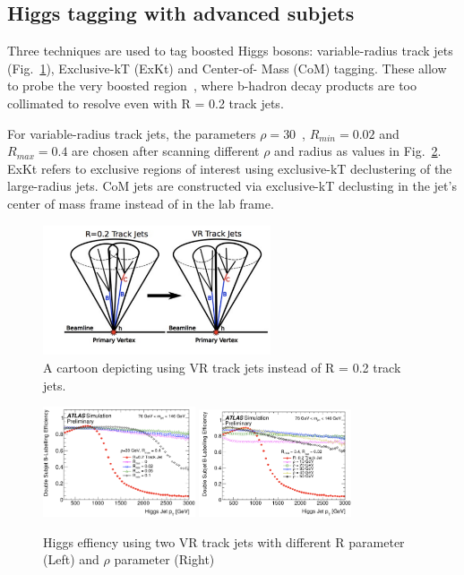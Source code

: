 \subsection{Higgs tagging with advanced subjets}

\par Three techniques are used to tag boosted Higgs bosons: variable-radius track jets (Fig.~\ref{fig:vr}), Exclusive-kT (ExKt) and Center-of- Mass (CoM) tagging. These allow to probe the very boosted region~\cite{ATL-PHYS-PUB-2017-010}, where b-hadron decay products are too collimated to resolve even with R = 0.2 track jets.
\par For variable-radius track jets, the parameters $\rho = 30$~\GeV, $R_{min} = 0.02$ and $R_{max} = 0.4$ 
are chosen after scanning different $\rho$ and radius as values in Fig.~\ref{fig:vr-scan}. ExKt refers to exclusive regions of interest using exclusive-kT declustering of the large-radius jets. 
CoM jets are constructed via exclusive-kT declusting in the jet's center of mass frame instead of in the lab frame.

\begin{figure}[htbp]
    \centering
    \includegraphics[width=0.6\textwidth]{chapters/c5/figures/VR}
    \caption{A cartoon depicting using VR track jets instead of R = 0.2 track jets.}
    \label{fig:vr}
\end{figure}

\begin{figure}[htbp]
    \centering
    \includegraphics[width=0.4\textwidth]{chapters/c5/figures/r-vr}
    \includegraphics[width=0.4\textwidth]{chapters/c5/figures/rho-vr}
    \caption{Higgs effiency using two VR track jets with different R parameter (Left) and $\rho$ parameter (Right)} 
    \label{fig:vr-scan}
\end{figure}

